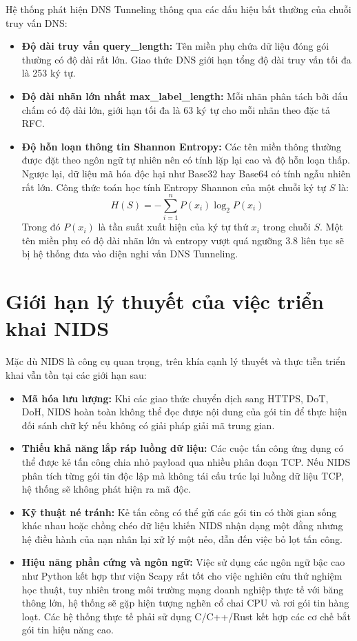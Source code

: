 Hệ thống phát hiện DNS Tunneling thông qua các dấu hiệu bất thường của chuỗi truy vấn DNS:
\begin{itemize}
    \item \textbf{Độ dài truy vấn query\_length:} Tên miền phụ chứa dữ liệu đóng gói thường có độ dài rất lớn. Giao thức DNS giới hạn tổng độ dài truy vấn tối đa là 253 ký tự.
    \item \textbf{Độ dài nhãn lớn nhất max\_label\_length:} Mỗi nhãn phân tách bởi dấu chấm có độ dài lớn, giới hạn tối đa là 63 ký tự cho mỗi nhãn theo đặc tả RFC.
    \item \textbf{Độ hỗn loạn thông tin Shannon Entropy:} Các tên miền thông thường được đặt theo ngôn ngữ tự nhiên nên có tính lặp lại cao và độ hỗn loạn thấp. Ngược lại, dữ liệu mã hóa độc hại như Base32 hay Base64 có tính ngẫu nhiên rất lớn. Công thức toán học tính Entropy Shannon của một chuỗi ký tự $S$ là:
    $$H(S) = - \sum_{i=1}^{n} P(x_i) \log_2 P(x_i)$$
    Trong đó $P(x_i)$ là tần suất xuất hiện của ký tự thứ $x_i$ trong chuỗi $S$. Một tên miền phụ có độ dài nhãn lớn và entropy vượt quá ngưỡng $3.8$ liên tục sẽ bị hệ thống đưa vào diện nghi vấn DNS Tunneling.
\end{itemize}

\section{Giới hạn lý thuyết của việc triển khai NIDS}
Mặc dù NIDS là công cụ quan trọng, trên khía cạnh lý thuyết và thực tiễn triển khai vẫn tồn tại các giới hạn sau:
\begin{itemize}
    \item \textbf{Mã hóa lưu lượng:} Khi các giao thức chuyển dịch sang HTTPS, DoT, DoH, NIDS hoàn toàn không thể đọc được nội dung của gói tin để thực hiện đối sánh chữ ký nếu không có giải pháp giải mã trung gian.
    \item \textbf{Thiếu khả năng lắp ráp luồng dữ liệu:} Các cuộc tấn công ứng dụng có thể được kẻ tấn công chia nhỏ payload qua nhiều phân đoạn TCP. Nếu NIDS phân tích từng gói tin độc lập mà không tái cấu trúc lại luồng dữ liệu TCP, hệ thống sẽ không phát hiện ra mã độc.
    \item \textbf{Kỹ thuật né tránh:} Kẻ tấn công có thể gửi các gói tin có thời gian sống khác nhau hoặc chồng chéo dữ liệu khiến NIDS nhận dạng một đằng nhưng hệ điều hành của nạn nhân lại xử lý một nẻo, dẫn đến việc bỏ lọt tấn công.
    \item \textbf{Hiệu năng phần cứng và ngôn ngữ:} Việc sử dụng các ngôn ngữ bậc cao như Python kết hợp thư viện Scapy rất tốt cho việc nghiên cứu thử nghiệm học thuật, tuy nhiên trong môi trường mạng doanh nghiệp thực tế với băng thông lớn, hệ thống sẽ gặp hiện tượng nghẽn cổ chai CPU và rơi gói tin hàng loạt. Các hệ thống thực tế phải sử dụng C/C++/Rust kết hợp các cơ chế bắt gói tin hiệu năng cao.
\end{itemize}
